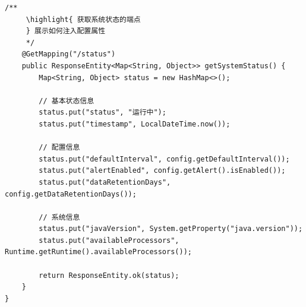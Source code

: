 \begin{lstlisting}[style=java]
    /**
     \highlight{ 获取系统状态的端点
     } 展示如何注入配置属性
     */
    @GetMapping("/status")
    public ResponseEntity<Map<String, Object>> getSystemStatus() {
        Map<String, Object> status = new HashMap<>();
        
        // 基本状态信息
        status.put("status", "运行中");
        status.put("timestamp", LocalDateTime.now());
        
        // 配置信息
        status.put("defaultInterval", config.getDefaultInterval());
        status.put("alertEnabled", config.getAlert().isEnabled());
        status.put("dataRetentionDays", config.getDataRetentionDays());
        
        // 系统信息
        status.put("javaVersion", System.getProperty("java.version"));
        status.put("availableProcessors", Runtime.getRuntime().availableProcessors());
        
        return ResponseEntity.ok(status);
    }
}
\end{lstlisting}


